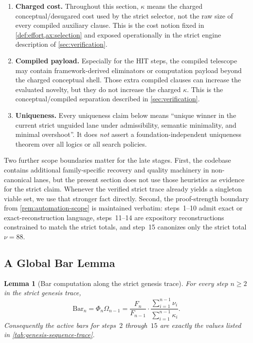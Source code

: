 \documentclass[11pt,a4paper]{article}
\theoremstyle{plain}
\newtheorem{lemma}[theorem]{Lemma}
\theoremstyle{definition}
\theoremstyle{remark}
\begin{document}
\begin{enumerate}[nosep]
    \item \textbf{Charged cost.} Throughout this section, $\kappa$ means the
    charged conceptual/desugared cost used by the strict selector, not the raw
    size of every compiled auxiliary clause.
    This is the cost notion fixed in \cref{def:effort,ax:selection} and exposed
    operationally in the strict engine description of
    \cref{sec:verification}.
    \item \textbf{Compiled payload.} Especially for the HIT steps, the compiled
    telescope may contain framework-derived eliminators or computation payload
    beyond the charged conceptual shell.
    Those extra compiled clauses can increase the evaluated novelty, but they do
    not increase the charged $\kappa$.
    This is the conceptual/compiled separation described in
    \cref{sec:verification}.
    \item \textbf{Uniqueness.} Every uniqueness claim below means
    ``unique winner in the current strict unguided lane under admissibility,
    semantic minimality, and minimal overshoot''.
    It does \emph{not} assert a foundation-independent uniqueness theorem over
    all logics or all search policies.
\end{enumerate}

Two further scope boundaries matter for the late stages.
First, the codebase contains additional family-specific recovery and quality
machinery in non-canonical lanes, but the present section does not use those
heuristics as evidence for the strict claim.
Whenever the verified strict trace already yields a singleton viable set, we use
that stronger fact directly.
Second, the proof-strength boundary from \cref{rem:automation-scope} is
maintained verbatim:
steps~1--10 admit exact or exact-reconstruction language,
steps~11--14 are expository reconstructions constrained to match the strict
totals, and step~15 canonizes only the strict total $\nu=88$.

\subsection{A Global Bar Lemma}
\label{subsec:genesis-bar-lemma}

\begin{lemma}[Bar computation along the strict genesis trace]
\label{lem:genesis-bar-lemma}
For every step $n \ge 2$ in the strict genesis trace,
\[
  \mathrm{Bar}_n
  =
  \Phi_n \Omega_{n-1}
  =
  \frac{F_n}{F_{n-1}}
  \cdot
  \frac{\sum_{i=1}^{n-1}\nu_i}{\sum_{i=1}^{n-1}\kappa_i}.
\]
Consequently the active bars for steps~$2$ through~$15$ are exactly the values
listed in \cref{tab:genesis-sequence-trace}.
\end{lemma}
\end{document}
